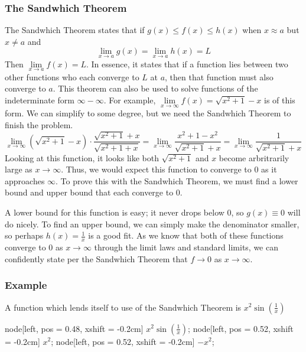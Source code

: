 \documentclass[12pt]{report}
\newcommand{\limit}{\lim\limits}
\begin{document}
\begin{flushleft}
\subsubsection*{The Sandwhich Theorem}
The Sandwhich Theorem states that if \(g(x) \leq f(x) \leq h(x)\) when 
\(x \approx a\) but \(x \neq a\) and
\[\limit_{x\rightarrow a}g(x) = \limit_{x\rightarrow a}h(x) = L\]
Then \(\limit_{x\rightarrow a}f(x) = L\). In essence, it states that if a 
function lies between two other functions who each converge to \(L\) at \(a\),
then that function must also converge to \(a\). This theorem can also be used
to solve functions of the indeterminate form \(\infty - \infty\). For example,
\(\limit_{x\rightarrow\infty} f(x) = \sqrt{x^2 + 1} - x\) is of this form. We
can simplify to some degree, but we need the Sandwhich Theorem to finish the 
problem.
\[\limit_{x\rightarrow\infty} \left(\sqrt{x^2 + 1} - x\right) \cdot 
\frac{\sqrt{x^2 + 1} + x}{\sqrt{x^2 + 1 + x}} 
= \limit_{x\rightarrow\infty} \frac{x^2 + 1 - x^2}{\sqrt{x^2 + 1} + x} 
= \limit_{x\rightarrow\infty} \frac{1}{\sqrt{x^2 + 1} + x}\]
Looking at this function, it looks like both \(\sqrt{x^2 + 1}\) and \(x\) 
become arbritrarily large as \(x\rightarrow\infty\). Thus, we would expect this
function to converge to \(0\) as it approaches \(\infty\). To prove this with 
the Sandwhich Theorem, we must find a lower bound and upper bound that each 
converge to \(0\). \par
A lower bound for this function is easy; it never drops below \(0\), so 
\(g(x)\equiv0\) will do nicely. To find an upper bound, we can simply make the 
denominator smaller, so perhaps \(h(x) = \frac{1}{x}\) is a good fit. As we
know that both of these functions converge to \(0\) as \(x\rightarrow\infty\)
through the limit laws and standard limits, we can confidently state per the
Sandwhich Theorem that \(f\rightarrow0\) as \(x\rightarrow\infty\).

\subsubsection*{Example}
A function which lends itself to use of the Sandwhich Theorem is 
\(x^2\sin(\frac{1}{x})\)

\begin{plot}[
    xmax = 0.5,
    xmin = -0.5,
    ymax = 0.2,
    ymin = -0.2
]
    node[left, pos = 0.48, xshift = -0.2cm] 
    {\(x^2\sin\left(\frac{1}{x}\right)\)};
    node[left, pos = 0.52, xshift = -0.2cm] {\(x^2\)};
    node[left, pos = 0.52, xshift = -0.2cm] {\(-x^2\)};
\end{plot}


\end{flushleft}
\end{document}

